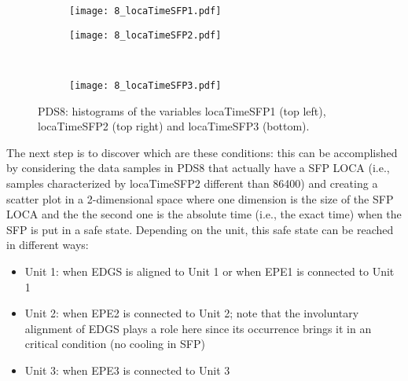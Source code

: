 \begin{figure}
  \begin{subfigure}{.5\linewidth}
    \centering
    \texttt{[image: 8\_locaTimeSFP1.pdf]}
  \end{subfigure}%
  \begin{subfigure}{.5\linewidth}
    \centering
    \texttt{[image: 8\_locaTimeSFP2.pdf]}
  \end{subfigure}\\[1ex]
  \begin{subfigure}{\linewidth}
    \centering
    \texttt{[image: 8\_locaTimeSFP3.pdf]}
  \end{subfigure}
  \caption{PDS8: histograms of the variables locaTimeSFP1 (top left), locaTimeSFP2 (top right) and locaTimeSFP3 (bottom).}
  \label{fig:histPDS8_8_locaTimeSFP}
\end{figure}

The next step is to discover which are these conditions: this can be accomplished by considering the data samples
in PDS8 that actually have a SFP LOCA (i.e., samples characterized by locaTimeSFP2 different than 86400) 
and creating a scatter plot
in a 2-dimensional space where one dimension is the size of the SFP LOCA and the the second one is
the absolute time (i.e., the exact time) when the SFP is put in a safe state. 
Depending on the unit, this safe state can be reached in different ways:
\begin{itemize}
  \item Unit 1: when EDGS is aligned to Unit 1 or when EPE1 is connected to Unit 1
  \item Unit 2: when EPE2 is connected to Unit 2; note that the involuntary alignment of EDGS plays a role here since
                its occurrence brings it in an critical condition (no cooling in SFP)
  \item Unit 3: when EPE3 is connected to Unit 3
\end{itemize}


